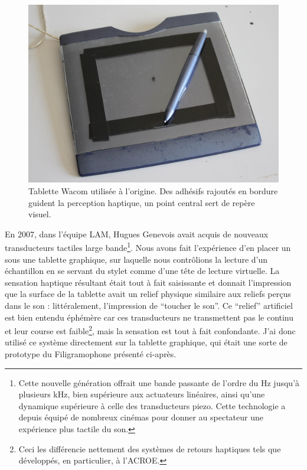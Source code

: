 \begin{figure}[!htbp]
	\captionsetup{format=plain}%
	\includegraphics[width=\textwidth]{gfx/05_interfaces/wacom.jpg}
	\caption[Tablette wacom]{Tablette Wacom utilisée à l'origine. Des adhésifs rajoutés en bordure guident la perception haptique, un point central sert de repère visuel.}
	\label{fig:interface:wacom}
\end{figure}
\indent En 2007, dans l'équipe \gls{LAM}, Hugues Genevois avait acquis de nouveaux transducteurs tactiles large bande\footnote{Cette nouvelle génération offrait une bande passante de l'ordre du Hz jusqu'à plusieurs kHz, bien supérieure aux actuateurs linéaires, ainsi qu'une dynamique supérieure à celle des transducteurs piezo. Cette technologie a depuis équipé de nombreux cinémas pour donner au spectateur une expérience plus tactile du son.}. Nous avons fait l'expérience d'en placer un sous une tablette graphique, sur laquelle nous contrôlions la lecture d'un échantillon en se servant du stylet comme d'une tête de lecture virtuelle. La sensation haptique résultant était tout à fait saisissante et donnait l'impression que la surface de la tablette avait un relief physique similaire aux reliefs perçus dans le son : littéralement, l'impression de ``toucher le son''. Ce ``relief'' artificiel est bien entendu éphémère car ces transducteurs ne transmettent pas le continu et leur course est faible\footnote{Ceci les différencie nettement des systèmes de retours haptiques tels que développés, en particulier, à l'\gls{ACROE}.}, mais la sensation est tout à fait confondante. J'ai donc utilisé ce système directement sur la tablette graphique, qui était une sorte de prototype du Filigramophone présenté ci-après.

